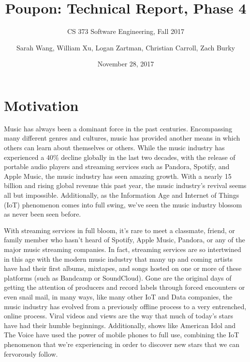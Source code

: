 \documentclass{scrartcl}
\title{Poupon: Technical Report, Phase 4}
\subtitle{CS 373 Software Engineering, Fall 2017}
\author{Sarah Wang, William Xu, Logan Zartman, Christian Carroll, Zach Burky}
\date{November 28, 2017}
\begin{document}
    \maketitle

    \tableofcontents

    \newpage
    \section{Motivation}\label{sec:motivation}
    \indent
    Music has always been a dominant force in the past centuries.
    Encompassing many different genres and cultures, music has provided another means in which others can learn about themselves or others.
    While the music industry has experienced a 40\% decline globally in the last two decades, with the release of portable audio players and streaming services such as Pandora, Spotify, and Apple Music, the music industry has seen amazing growth.
    With a nearly 15 billion and rising global revenue this past year, the music industry's revival seems all but impossible.
    Additionally, as the Information Age and Internet of Things (IoT) phenomenon comes into full swing, we've seen the music industry blossom as never been seen before.

    With streaming services in full bloom, it's rare to meet a classmate, friend, or family member who hasn't heard of Spotify, Apple Music, Pandora, or any of the major music streaming companies.
    In fact, streaming services are so intertwined in this age with the modern music industry that many up and coming artists have had their first albums, mixtapes, and songs hosted on one or more of these platforms (such as Bandcamp or SoundCloud).
    Gone are the original days of getting the attention of producers and record labels through forced encounters or even snail mail, in many ways, like many other IoT and Data companies, the music industry has evolved from a previously offline process to a very entrenched, online process.
    Viral videos and views are the way that much of today's stars have had their humble beginnings.
    Additionally, shows like American Idol and The Voice have used the power of mobile phones to full use, combining the IoT phenomenon that we're experiencing in order to discover new stars that we can fervorously follow.
\end{document}
